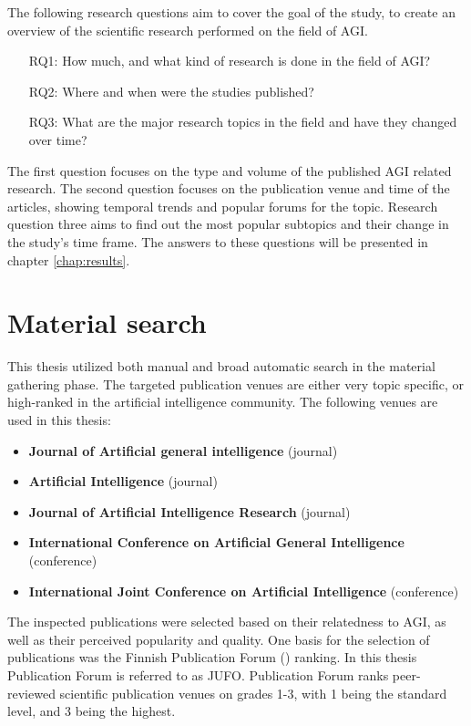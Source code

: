The following research questions aim to cover the goal of the study, to create
an overview of the scientific research performed on the field of AGI.

\begin{itemize}
  \item[RQ1:] How much, and what kind of research is done in the field of AGI?
  \item[RQ2:] Where and when were the studies published?
  \item[RQ3:] What are the major research topics in the field and have they
        changed over time?
\end{itemize}

The first question focuses on the type and volume of the published AGI related
research. The second question focuses on the publication venue and time of the
articles, showing temporal trends and popular forums for the topic. Research
question three aims to find out the most popular subtopics and their change in
the study's time frame. The answers to these questions will be presented in
chapter \ref*{chap:results}.


\section{Material search}

This thesis utilized both manual and broad automatic search in the material
gathering phase. The targeted publication venues are either very topic specific,
or high-ranked in the artificial intelligence community. The following venues
are used in this thesis:

\begin{itemize}
  \item \textbf{Journal of Artificial general intelligence} (journal)
  \item \textbf{Artificial Intelligence} (journal)
  \item \textbf{Journal of Artificial Intelligence Research} (journal)
  \item \textbf{International Conference on Artificial General Intelligence}
        (conference)
  \item \textbf{International Joint Conference on Artificial Intelligence}
        (conference)
\end{itemize}

The inspected publications were selected based on their relatedness to AGI, as
well as their perceived popularity and quality. One basis for the selection of
publications was the Finnish Publication Forum (\cite{jufo}) ranking. In this
thesis Publication Forum is referred to as JUFO. Publication Forum ranks
peer-reviewed scientific publication venues on grades 1-3, with 1 being the
standard level, and 3 being the highest.

